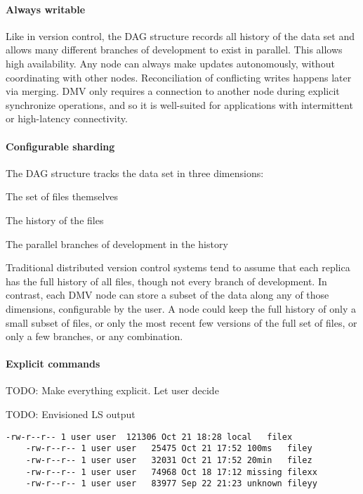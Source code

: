 \paragraph{Always writable}
Like in version control, the DAG structure records all history of the data set
and allows many different branches of development to exist in parallel. This
allows high availability. Any node can always make updates autonomously, without
coordinating with other nodes. Reconciliation of conflicting writes happens
later via merging. DMV only requires a connection to another node during
explicit synchronize operations, and so it is well-suited for applications with
intermittent or high-latency connectivity.

\paragraph{Configurable sharding}
The DAG structure tracks the data set in three dimensions:

\begin{tight_enumerate}
    \item The set of files themselves
    \item The history of the files
    \item The parallel branches of development in the history
\end{tight_enumerate}

Traditional distributed version control systems tend to assume that each replica
has the full history of all files, though not every branch of development. In
contrast, each DMV node can store a subset of the data along any of those
dimensions, configurable by the user. A node could keep the full history of only
a small subset of files, or only the most recent few versions of the full set of
files, or only a few branches, or any combination.


\paragraph{Explicit commands}
TODO: Make everything explicit. Let user decide


TODO: Envisioned LS output

\begin{lstlisting}[caption=Example ls output]
    -rw-r--r-- 1 user user  121306 Oct 21 18:28 local   filex
    -rw-r--r-- 1 user user   25475 Oct 21 17:52 100ms   filey
    -rw-r--r-- 1 user user   32031 Oct 21 17:52 20min   filez
    -rw-r--r-- 1 user user   74968 Oct 18 17:12 missing filexx
    -rw-r--r-- 1 user user   83977 Sep 22 21:23 unknown fileyy
\end{lstlisting}



